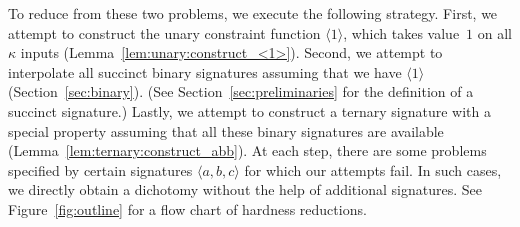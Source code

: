 \documentclass[11pt]{article}
\begin{document}
To reduce from these two problems,
we execute the following strategy.
First, we attempt to construct the unary constraint function $\langle 1 \rangle$,
which takes value~$1$ on all $\kappa$ inputs (Lemma~\ref{lem:unary:construct_<1>}).
Second, we attempt to interpolate all succinct binary signatures assuming that we have $\langle 1 \rangle$ (Section~\ref{sec:binary}).
(See Section~\ref{sec:preliminaries} for the definition of a succinct signature.)
Lastly, we attempt to construct a ternary signature with a special property assuming that all these binary signatures are available (Lemma~\ref{lem:ternary:construct_abb}).
At each step,
there are some problems specified by certain signatures $\langle a,b,c \rangle$ for which our attempts fail.
In such cases,
we directly obtain a dichotomy without the help of additional signatures.
See Figure~\ref{fig:outline} for a flow chart of hardness reductions.
\end{document}

